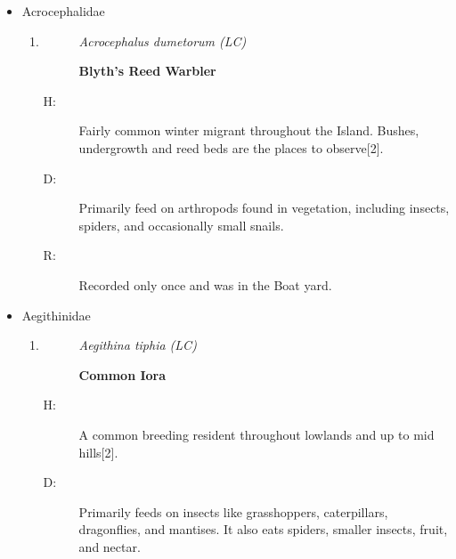 \begin{itemize}
\begin{enumerate}
\begin{description}
\end{description}%
\begin{description}%
\item[H: ]%
Fairly common locally throughout the island and a breeding resident. Well wooded areas is the preferred habitat{[}2{]}.%
\item[D: ]%
Has a diverse diet, preying on a variety of animals including mammals, large birds, reptiles such as snakes and lizards, fish and amphibians like frogs.%
\item[R: ]%
Observed only twice and was in the boat yard at the opposite bank.%
\end{description}%
\end{enumerate}%
\item%
Acrocephalidae%
\begin{enumerate}%
\item%
\begin{description}%
\item[]%
\textit{Acrocephalus dumetorum (LC)}%
\item[]%
\textbf{Blyth's Reed Warbler}%
\end{description}%
\begin{description}%
\item[H: ]%
Fairly common winter migrant throughout the Island. Bushes, undergrowth and reed beds are the places to observe{[}2{]}.%
\item[D: ]%
Primarily feed on arthropods found in vegetation, including insects, spiders, and occasionally small snails.%
\item[R: ]%
Recorded only once and was in the Boat yard.%
\end{description}%
\end{enumerate}%
\item%
Aegithinidae%
\begin{enumerate}%
\item%
\begin{description}%
\item[]%
\textit{Aegithina tiphia (LC)}%
\item[]%
\textbf{Common Iora}%
\end{description}%
\begin{description}%
\item[H: ]%
A common breeding resident throughout lowlands and up to mid hills{[}2{]}.%
\item[D: ]%
Primarily feeds on insects like grasshoppers, caterpillars, dragonflies, and mantises. It also eats spiders, smaller insects, fruit, and nectar.%

\end{description}
\end{enumerate}
\end{itemize}
